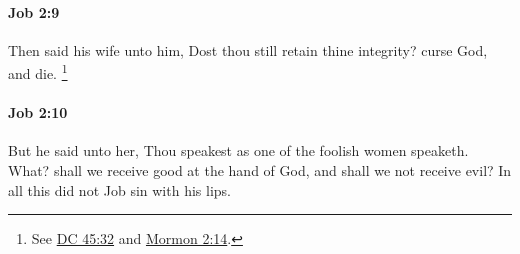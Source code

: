 		\paragraph{Job 2:9} %
			\label{JOB-2-9}

			Then said his wife unto him, Dost thou still retain thine integrity? curse God, and die.%
				\footnote{%
					See \hyperref[DC45-32]{DC 45:32} and \hyperref[MORMON-2-14]{Mormon 2:14}.
					}


		\paragraph{Job 2:10} %
			\label{JOB-2-10}

			But he said unto her, Thou speakest as one of the foolish women speaketh. What? shall we receive good at the hand of God, and shall we not receive evil? In all this did not Job sin with his lips.

